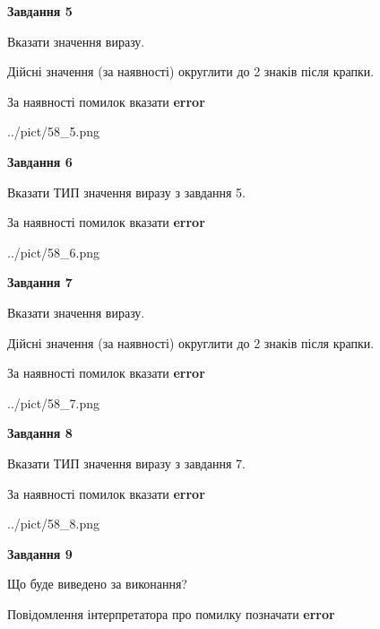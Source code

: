 \documentclass[11pt, ukrainian]{article}
\begin{document}
{\begin {large}
{\begin {center}\textbf{Завдання 5}\end {center}}\par
Вказати значення виразу. \par
Дійсні значення (за наявності) округлити до 2 знаків після крапки. \par
За наявності помилок вказати \textbf{error}

\begin{center}
	{../pict/58_5.png}
\end{center}
\newpage

{\begin {center}\textbf{Завдання 6}\end {center}}\par
Вказати ТИП значення виразу з завдання 5. \par
За наявності помилок вказати \textbf{error}

\begin{center}
	{../pict/58_6.png}
\end{center}
\newpage

{\begin {center}\textbf{Завдання 7}\end {center}}\par
Вказати значення виразу. \par
Дійсні значення (за наявності) округлити до 2 знаків після крапки. \par
За наявності помилок вказати \textbf{error}

\begin{center}
	{../pict/58_7.png}
\end{center}
\newpage

{\begin {center}\textbf{Завдання 8}\end {center}}\par
Вказати ТИП значення виразу з завдання 7. \par
За наявності помилок вказати \textbf{error}

\begin{center}
	{../pict/58_8.png}
\end{center}
\newpage

{\begin {center}\textbf{Завдання 9}\end {center}}\par
Що буде виведено за виконання? \par
Повідомлення інтерпретатора про помилку позначати \textbf{error}


\end{large}}
\end{document}
